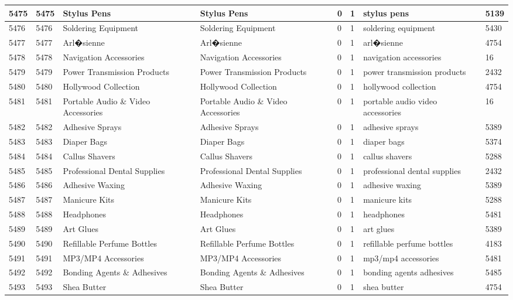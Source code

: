 \begin{longtable}{|l|l|l|l|l|l|l|l|}
5475 & 5475 & Stylus Pens & Stylus Pens & 0 & 1 & stylus pens & 5139 \\ \hline 
5476 & 5476 & Soldering Equipment & Soldering Equipment & 0 & 1 & soldering equipment & 5430 \\ \hline 
5477 & 5477 & Arl�sienne & Arl�sienne & 0 & 1 & arl�sienne & 4754 \\ \hline 
5478 & 5478 & Navigation Accessories & Navigation Accessories & 0 & 1 & navigation accessories & 16 \\ \hline 
5479 & 5479 & Power Transmission Products & Power Transmission Products & 0 & 1 & power transmission products & 2432 \\ \hline 
5480 & 5480 & Hollywood Collection & Hollywood Collection & 0 & 1 & hollywood collection & 4754 \\ \hline 
5481 & 5481 & Portable Audio \& Video Accessories & Portable Audio \& Video Accessories & 0 & 1 & portable audio video accessories & 16 \\ \hline 
5482 & 5482 & Adhesive Sprays & Adhesive Sprays & 0 & 1 & adhesive sprays & 5389 \\ \hline 
5483 & 5483 & Diaper Bags & Diaper Bags & 0 & 1 & diaper bags & 5374 \\ \hline 
5484 & 5484 & Callus Shavers & Callus Shavers & 0 & 1 & callus shavers & 5288 \\ \hline 
5485 & 5485 & Professional Dental Supplies & Professional Dental Supplies & 0 & 1 & professional dental supplies & 2432 \\ \hline 
5486 & 5486 & Adhesive Waxing & Adhesive Waxing & 0 & 1 & adhesive waxing & 5389 \\ \hline 
5487 & 5487 & Manicure Kits & Manicure Kits & 0 & 1 & manicure kits & 5288 \\ \hline 
5488 & 5488 & Headphones & Headphones & 0 & 1 & headphones & 5481 \\ \hline 
5489 & 5489 & Art Glues & Art Glues & 0 & 1 & art glues & 5389 \\ \hline 
5490 & 5490 & Refillable Perfume Bottles & Refillable Perfume Bottles & 0 & 1 & refillable perfume bottles & 4183 \\ \hline 
5491 & 5491 & MP3/MP4 Accessories & MP3/MP4 Accessories & 0 & 1 & mp3/mp4 accessories & 5481 \\ \hline 
5492 & 5492 & Bonding Agents \& Adhesives & Bonding Agents \& Adhesives & 0 & 1 & bonding agents adhesives & 5485 \\ \hline 
5493 & 5493 & Shea Butter & Shea Butter & 0 & 1 & shea butter & 4754 \\ \hline 

\end{longtable}

